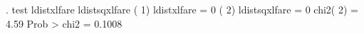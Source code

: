 . test ldistxlfare ldistsqxlfare
{\smallskip}
 ( 1)  ldistxlfare = 0
 ( 2)  ldistsqxlfare = 0
{\smallskip}
           chi2(  2) =    4.59
         Prob > chi2 =    0.1008
{\smallskip}
